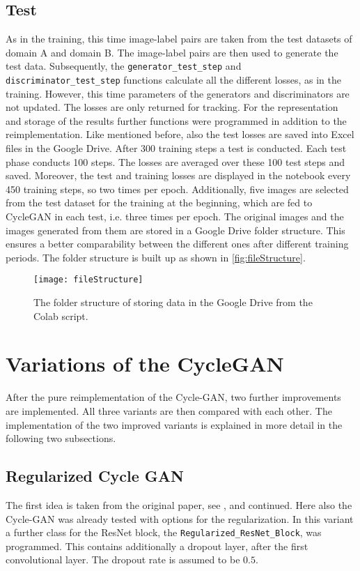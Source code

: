 \documentclass[fleqn,10pt]{SelfArx} %
\begin{document}
\subsection{Test}
As in the training, this time image-label pairs are taken from the test datasets of domain A and domain B. The image-label pairs are then used to generate the test data. Subsequently, the \texttt{generator\_test\_step} and \texttt{discriminator\_test\_step} functions calculate all the different losses, as in the training. However, this time parameters of the generators and discriminators are not updated. The losses are only returned for tracking.
For the representation and storage of the results further functions were programmed in addition to the reimplementation. Like mentioned before, also the test losses are saved into Excel files in the Google Drive. After 300 training steps a test is conducted. Each test phase conducts 100 steps. The losses are averaged over these 100 test steps and saved. Moreover, the test and training losses are displayed in the notebook every 450 training steps, so two times per epoch. Additionally, five images are selected from the test dataset for the training at the beginning, which are fed to Cycle\ac{GAN} in each test, i.e. three times per epoch. The original images and the images generated from them are stored in a Google Drive folder structure. This ensures a better comparability between the different ones after different training periods. The folder structure is built up as shown in \autoref{fig:fileStructure}.

\begin{figure}[htb] 
	\centering 
	\texttt{[image: fileStructure]}
	\caption{The folder structure of storing data in the Google Drive from the Colab script.}
	\label{fig:fileStructure}
\end{figure}

\section{Variations of the Cycle\ac{GAN}}
After the pure reimplementation of the Cycle-\ac{GAN}, two further improvements are implemented. All three variants are then compared with each other. The implementation of the two improved variants is explained in more detail in the following two subsections.

\subsection{Regularized Cycle GAN}
The first idea is taken from the original paper, see \cite{image-to-image-ccan}, and continued. Here also the Cycle-\ac{GAN} was already tested with options for the regularization. In this variant a further class for the \ac{ResNet} block, the \texttt{Regularized\_ResNet\_Block}, was programmed. This contains additionally a dropout layer, after the first convolutional layer. The dropout rate is assumed to be $0.5$.
\end{document}
